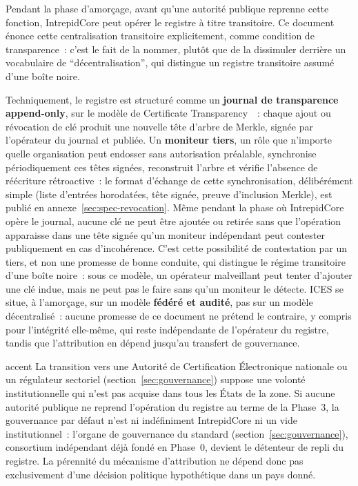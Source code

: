 \documentclass[11pt,a4paper]{article}
\begin{document}
Pendant la phase d'amorçage, avant qu'une autorité publique reprenne cette fonction, IntrepidCore peut opérer le registre à titre transitoire. Ce document énonce cette centralisation transitoire explicitement, comme condition de transparence~: c'est le fait de la nommer, plutôt que de la dissimuler derrière un vocabulaire de \enquote{décentralisation}, qui distingue un registre transitoire assumé d'une boîte noire.

Techniquement, le registre est structuré comme un \textbf{journal de transparence append-only}, sur le modèle de Certificate Transparency~\cite{rfc6962}~: chaque ajout ou révocation de clé produit une nouvelle tête d'arbre de Merkle, signée par l'opérateur du journal et publiée. Un \textbf{moniteur tiers}, un rôle que n'importe quelle organisation peut endosser sans autorisation préalable, synchronise périodiquement ces têtes signées, reconstruit l'arbre et vérifie l'absence de réécriture rétroactive~: le format d'échange de cette synchronisation, délibérément simple (liste d'entrées horodatées, tête signée, preuve d'inclusion Merkle), est publié en annexe~\ref{sec:spec-revocation}. Même pendant la phase où IntrepidCore opère le journal, aucune clé ne peut être ajoutée ou retirée sans que l'opération apparaisse dans une tête signée qu'un moniteur indépendant peut contester publiquement en cas d'incohérence. C'est cette possibilité de contestation par un tiers, et non une promesse de bonne conduite, qui distingue le régime transitoire d'une boîte noire~: sous ce modèle, un opérateur malveillant peut tenter d'ajouter une clé indue, mais ne peut pas le faire sans qu'un moniteur le détecte. ICES se situe, à l'amorçage, sur un modèle \textbf{fédéré et audité}, pas sur un modèle décentralisé~: aucune promesse de ce document ne prétend le contraire, y compris pour l'intégrité elle-même, qui reste indépendante de l'opérateur du registre, tandis que l'attribution en dépend jusqu'au transfert de gouvernance.

\begin{icesbox}{accent}
La transition vers une Autorité de Certification Électronique nationale ou un régulateur sectoriel (section~\ref{sec:gouvernance}) suppose une volonté institutionnelle qui n'est pas acquise dans tous les États de la zone. Si aucune autorité publique ne reprend l'opération du registre au terme de la Phase~3, la gouvernance par défaut n'est ni indéfiniment IntrepidCore ni un vide institutionnel~: l'organe de gouvernance du standard (section~\ref{sec:gouvernance}), consortium indépendant déjà fondé en Phase~0, devient le détenteur de repli du registre. La pérennité du mécanisme d'attribution ne dépend donc pas exclusivement d'une décision politique hypothétique dans un pays donné.
\end{icesbox}
\end{document}

